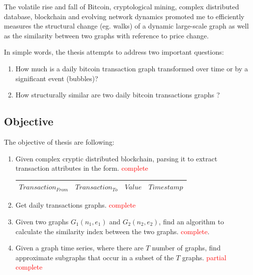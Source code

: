 \documentclass[12pt,a4paper]{article}
\numberwithin{equation}{section}
\numberwithin{figure}{section}
\numberwithin{table}{section}
\begin{document}
The volatile rise and fall of Bitcoin, cryptological mining, complex distributed database, blockchain and evolving network dynamics promoted me to  efficiently measures the structural change (eg. walks) of a dynamic large-scale graph as well as the similarity between two graphs with reference to price change. 

In simple words, the thesis attempts to address two important questions:  
\begin{enumerate}
\item How much is a daily bitcoin transaction graph transformed over time or by a significant event (bubbles)?
\item How structurally similar are two daily bitcoin transactions graphs ?
\end{enumerate}
 


\subsection{Objective}
\label{subsec:Objective}

The objective of thesis are following:
\begin{enumerate}
\item Given complex cryptic distributed blockchain, parsing it to extract transaction attributes in the form. \textcolor{red}{complete}

\begin{center}
\begin{tabular}{ |c|c|c|c| } 
 \hline
 $Transaction_{From}$ & $Transaction_{To}$ & $Value$ & $Timestamp$ \\ 
  \hline
\end{tabular}
\end{center}

\item Get daily transactions graphs. \textcolor{red}{complete}

\item Given two graphs $G_1 (n_1 , e_1 )$ and $G_2 (n_2 , e_2 )$, find an algorithm to calculate the similarity index between the two graphs. \textcolor{red}{complete}.

\item Given a graph time series, where there are $T$ number of graphs, find approximate subgraphs that occur in a subset of the $T$ graphs. \textcolor{red}{ partial complete}

\end{enumerate}
\end{document}
